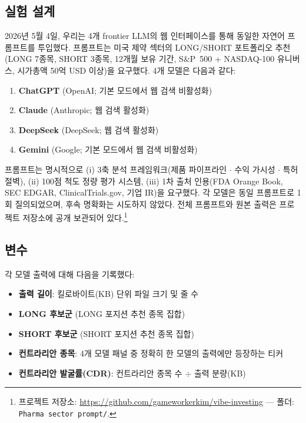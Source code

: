 \documentclass[11pt,letterpaper]{article}
\begin{document}
\subsection{실험 설계}

2026년 5월 4일, 우리는 4개 frontier LLM의 웹 인터페이스를 통해 동일한 자연어 프롬프트를 투입했다. 프롬프트는 미국 제약 섹터의 LONG/SHORT 포트폴리오 추천(LONG 7종목, SHORT 3종목, 12개월 보유 기간, S\&P~500 + NASDAQ-100 유니버스, 시가총액 50억 USD 이상)을 요구했다. 4개 모델은 다음과 같다:

\begin{enumerate}\setlength\itemsep{2pt}
\item \textbf{ChatGPT} (OpenAI; 기본 모드에서 웹 검색 비활성화)
\item \textbf{Claude} (Anthropic; 웹 검색 활성화)
\item \textbf{DeepSeek} (DeepSeek; 웹 검색 활성화)
\item \textbf{Gemini} (Google; 기본 모드에서 웹 검색 비활성화)
\end{enumerate}

프롬프트는 명시적으로 (i) 3축 분석 프레임워크(제품 파이프라인 $\cdot$ 수익 가시성 $\cdot$ 특허 절벽), (ii) 100점 척도 정량 평가 시스템, (iii) 1차 출처 인용(FDA Orange Book, SEC EDGAR, ClinicalTrials.gov, 기업 IR)을 요구했다. 각 모델은 동일 프롬프트로 1회 질의되었으며, 후속 명확화는 시도하지 않았다. 전체 프롬프트와 원본 출력은 프로젝트 저장소에 공개 보관되어 있다.\footnote{프로젝트 저장소: \url{https://github.com/gameworkerkim/vibe-investing} --- 폴더: \texttt{Pharma sector prompt/}.}

\subsection{변수}

각 모델 출력에 대해 다음을 기록했다:

\begin{itemize}\setlength\itemsep{2pt}
\item \textbf{출력 길이}: 킬로바이트(KB) 단위 파일 크기 및 줄 수
\item \textbf{LONG 후보군} (LONG 포지션 추천 종목 집합)
\item \textbf{SHORT 후보군} (SHORT 포지션 추천 종목 집합)
\item \textbf{컨트라리안 종목}: 4개 모델 패널 중 정확히 한 모델의 출력에만 등장하는 티커
\item \textbf{컨트라리안 발굴률(CDR)}: 컨트라리안 종목 수 $\div$ 출력 분량(KB)
\end{itemize}
\end{document}

